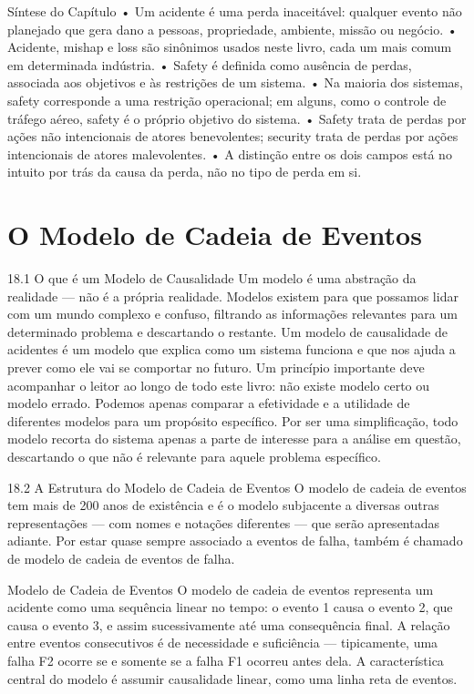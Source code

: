 Síntese do Capítulo • Um acidente é uma perda inaceitável: qualquer evento não planejado que gera dano a pessoas, propriedade, ambiente, missão ou negócio. • Acidente, mishap e loss são sinônimos usados neste livro, cada um mais comum em determinada indústria. • Safety é definida como ausência de perdas, associada aos objetivos e às restrições de um sistema. • Na maioria dos sistemas, safety corresponde a uma restrição operacional; em alguns, como o controle de tráfego aéreo, safety é o próprio objetivo do sistema. • Safety trata de perdas por ações não intencionais de atores benevolentes; security trata de perdas por ações intencionais de atores malevolentes. • A distinção entre os dois campos está no intuito por trás da causa da perda, não no tipo de perda em si.

\chapter{O Modelo de Cadeia de Eventos}

18.1 O que é um Modelo de Causalidade Um modelo é uma abstração da realidade — não é a própria realidade. Modelos existem para que possamos lidar com um mundo complexo e confuso, filtrando as informações relevantes para um determinado problema e descartando o restante. Um modelo de causalidade de acidentes é um modelo que explica como um sistema funciona e que nos ajuda a prever como ele vai se comportar no futuro. Um princípio importante deve acompanhar o leitor ao longo de todo este livro: não existe modelo certo ou modelo errado. Podemos apenas comparar a efetividade e a utilidade de diferentes modelos para um propósito específico. Por ser uma simplificação, todo modelo recorta do sistema apenas a parte de interesse para a análise em questão, descartando o que não é relevante para aquele problema específico.

18.2 A Estrutura do Modelo de Cadeia de Eventos O modelo de cadeia de eventos tem mais de 200 anos de existência e é o modelo subjacente a diversas outras representações — com nomes e notações diferentes — que serão apresentadas adiante. Por estar quase sempre associado a eventos de falha, também é chamado de modelo de cadeia de eventos de falha.

Modelo de Cadeia de Eventos O modelo de cadeia de eventos representa um acidente como uma sequência linear no tempo: o evento 1 causa o evento 2, que causa o evento 3, e assim sucessivamente até uma consequência final. A relação entre eventos consecutivos é de necessidade e suficiência — tipicamente, uma falha F2 ocorre se e somente se a falha F1 ocorreu antes dela. A característica central do modelo é assumir causalidade linear, como uma linha reta de eventos.

